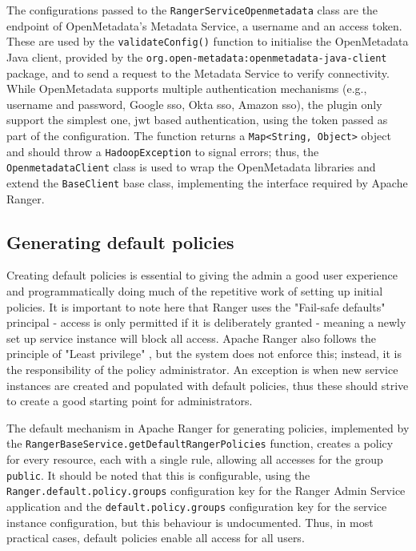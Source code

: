 The configurations passed to the \texttt{RangerServiceOpenmetadata} class are the endpoint of OpenMetadata's Metadata Service, a username and an access token. These are used by the \texttt{validateConfig()} function to initialise the OpenMetadata Java client, provided by the \texttt{org.open-metadata:openmetadata-java-client} package, and to send a request to the Metadata Service to verify connectivity. While OpenMetadata supports multiple authentication mechanisms (e.g., username and password, Google \acrshort{sso}, Okta \acrshort{sso}, Amazon \acrshort{sso}), the plugin only support the simplest one, \acrshort{jwt} based authentication, using the token passed as part of the configuration. The function returns a \texttt{Map<String, Object>} object and should throw a \texttt{HadoopException} to signal errors; thus, the \texttt{OpenmetadataClient} class is used to wrap the OpenMetadata libraries and extend the \texttt{BaseClient} base class, implementing the interface required by Apache Ranger.

\subsection{Generating default policies}

Creating default policies is essential to giving the admin a good user experience and programmatically doing much of the repetitive work of setting up initial policies.
It is important to note here that Ranger uses the "Fail-safe defaults" principal \cite{protectionOfInformationInComputerSystemsSaltzer1975} - access is only permitted if it is deliberately granted - meaning a newly set up service instance will block all access. Apache Ranger also follows the principle of "Least privilege" \cite{protectionOfInformationInComputerSystemsSaltzer1975}, but the system does not enforce this; instead, it is the responsibility of the policy administrator. An exception is when new service instances are created and populated with default policies, thus these should strive to create a good starting point for administrators.

The default mechanism in Apache Ranger for generating policies, implemented by the \texttt{RangerBaseService.getDefaultRangerPolicies} function, creates a policy for every resource, each with a single rule, allowing all accesses for the group \texttt{public}. It should be noted that this is configurable, using the \texttt{Ranger.default.policy.groups} configuration key for the Ranger Admin Service application and the \texttt{default.policy.groups} configuration key for the service instance configuration, but this behaviour is undocumented. Thus, in most practical cases, default policies enable all access for all users.

